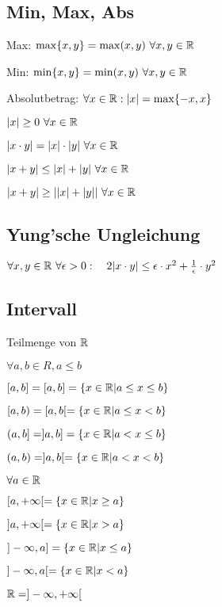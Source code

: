 \subsection{Min, Max, Abs}
\begin{compactdesc}
    \item[Max:] $\max \{x,y\} = \max(x, y) \ \forall x,y \in \mathbb{R}$
    \item[Min:] $\min \{x,y\} = \min(x, y) \ \forall x,y \in \mathbb{R}$
    \item[Absolutbetrag:] $\forall x \in \mathbb{R}: |x| = \max \{-x, x\} $
    \begin{compactenum}
        \item $|x| \ge 0 \ \forall x \in \mathbb{R}$
        \item $|x \cdot y| = |x| \cdot |y| \ \forall x \in \mathbb{R}$
        \item $|x + y| \le |x| + |y| \ \forall x \in \mathbb{R}$
        \item $|x + y| \ge ||x| + |y|| \ \forall x \in \mathbb{R}$
    \end{compactenum} 
\end{compactdesc}

\subsection{Yung'sche Ungleichung}
$\forall x,y \in \mathbb{R} \ \forall \epsilon > 0: \quad 2|x \cdot  y| \le \epsilon \cdot  x^2 + \frac{1}{\epsilon} \cdot y^2$

\subsection{Intervall}
Teilmenge von $\mathbb{R}$
\begin{compactenum}
    \item $\forall a,b \in R, a \le b$
        \begin{compactenum}
            \item $[a,b] = [a, b] = \{x \in \mathbb{R} | a \le  x \le b\} $
            \item $[a,b) = [a, b[ = \{x \in \mathbb{R} | a \le  x < b\} $ 
            \item $(a,b] = ]a, b] = \{x \in \mathbb{R} | a <  x \le b\} $
            \item $(a,b) = ]a, b[ = \{x \in \mathbb{R} | a <  x < b\} $
        \end{compactenum}
    \item $\forall  a \in \mathbb{R}$
        \begin{compactenum}
            \item $[a, +\infty[ = \{x \in \mathbb{R} | x \geq a\} $
            \item $]a, +\infty[ = \{x \in \mathbb{R} | x > a\} $
            \item $]-\infty, a] = \{x \in \mathbb{R} | x \le a\} $
            \item $]-\infty, a[ = \{x \in \mathbb{R} | x < a\} $
        \end{compactenum}
    \item $\mathbb{R} = ]-\infty, +\infty[$
\end{compactenum}


